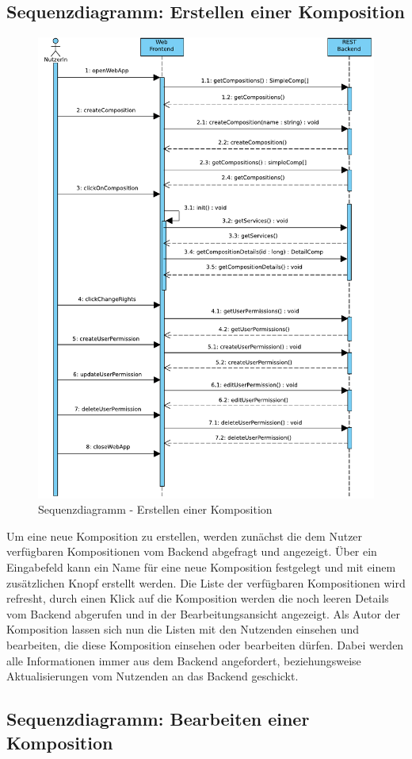 \subsection*{Sequenzdiagramm: Erstellen einer Komposition}

\begin{figure}[!h]
	\centering
	\includegraphics[width=.5\textwidth]{img/Diagramme/Sequenz/Frontend_createComp}
			
	\caption{Sequenzdiagramm - Erstellen einer Komposition}
	\label{fig:sequenz-createComp}
\end{figure}

\noindent
Um eine neue Komposition zu erstellen, werden zunächst die dem Nutzer verfügbaren Kompositionen vom Backend abgefragt und angezeigt. Über ein Eingabefeld kann ein Name für eine neue Komposition festgelegt und mit einem zusätzlichen Knopf erstellt werden. Die Liste der verfügbaren Kompositionen wird refresht, durch einen Klick auf die Komposition werden die noch leeren Details vom Backend abgerufen und in der Bearbeitungsansicht angezeigt. Als Autor der Komposition lassen sich nun die Listen mit den Nutzenden einsehen und bearbeiten, die diese Komposition einsehen oder bearbeiten dürfen. Dabei werden alle Informationen immer aus dem Backend angefordert, beziehungsweise Aktualisierungen vom Nutzenden an das Backend geschickt.

\newpage
\subsection*{Sequenzdiagramm: Bearbeiten einer Komposition}

